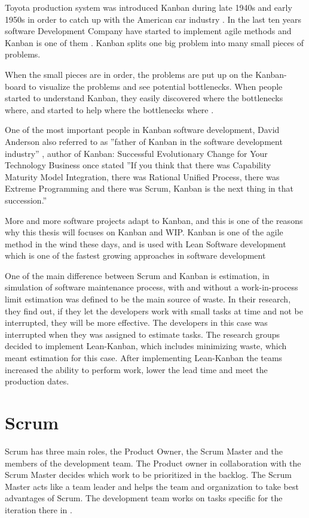 \documentclass[UKenglish]{ifimaster}  %
\begin{document}
Toyota production system was introduced Kanban during late 1940s and early 1950s in order to catch up with the American car industry \parencite{ono1988toyota} . In the last ten years software Development Company have started to implement agile methods and Kanban is one of them \parencite{Conboy}.  Kanban splits one big problem into many small pieces of problems.

When the small pieces are in order, the problems are put up on the Kanban-board to visualize the problems and see potential bottlenecks. When people started to understand Kanban, they easily discovered where the bottlenecks where, and started to help where the bottlenecks where \parencite{Shinkle}.

One of the most important people in Kanban software development, David Anderson  also referred to as ''father of Kanban in the software development industry''  \parencite{InfoQ:2013:May:Online}, author of Kanban: Successful Evolutionary Change for Your Technology Business once stated ''If you think that there was Capability Maturity Model Integration, there was Rational Unified Process, there was Extreme Programming and there was Scrum, Kanban is the next thing in that succession.''   \parencite{InfoQ} 

More and more software projects adapt to Kanban, and this is one of the reasons why this thesis will focuses on Kanban and WIP.
Kanban is one of the agile method in the wind these days, and is used with Lean Software development which is one of the fastest growing approaches in software development \parencite{DavidAnderson}

One of the main difference between Scrum and Kanban is estimation, in simulation of software maintenance process, with and without a work-in-process limit \parencite{SMR:SMR1599} estimation was defined to be the main source of waste. In their research, they find out, if they let the developers work with small tasks at time and not be interrupted, they will be more effective. The developers in this case was interrupted when they was assigned to estimate tasks. The research groups decided to implement Lean-Kanban, which includes minimizing waste, which meant estimation for this case. After implementing Lean-Kanban the teams increased the ability to perform work, lower the lead time and meet the production dates.

\section {Scrum}
Scrum has three main roles, the Product Owner, the Scrum Master and the members of the development team. The Product owner in collaboration with the Scrum Master decides which work to be prioritized in the backlog. The Scrum Master acts like a team leader and helps the team and organization to take best advantages of Scrum. The development team works on tasks specific for the iteration there in  \parencite{Scrum}.
\end{document}

